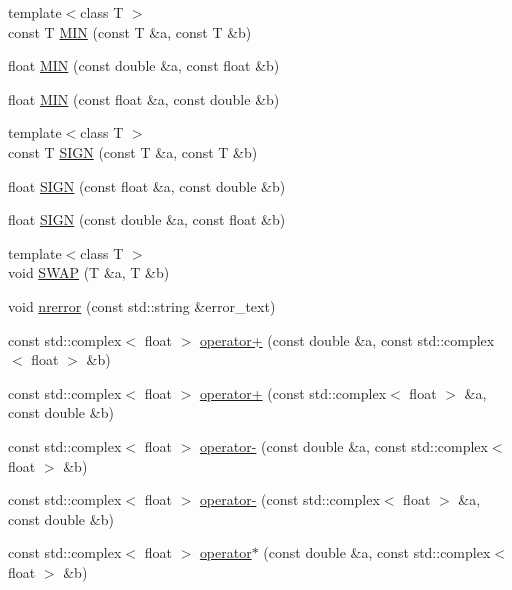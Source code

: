 \begin{DoxyCompactItemize}
\item 
{\footnotesize template$<$class T $>$ }\\const T \mbox{\hyperlink{namespaceNR_a15f220f878bd3544d0d5b2036cf73835}{M\+IN}} (const T \&a, const T \&b)
\item 
float \mbox{\hyperlink{namespaceNR_a5226e93da6f48d0d3702fa55e6c27052}{M\+IN}} (const double \&a, const float \&b)
\item 
float \mbox{\hyperlink{namespaceNR_a73fa23c417e474fe668884249420b5d9}{M\+IN}} (const float \&a, const double \&b)
\item 
{\footnotesize template$<$class T $>$ }\\const T \mbox{\hyperlink{namespaceNR_a7d16d361ddfe7454271c3a0a8050ece2}{S\+I\+GN}} (const T \&a, const T \&b)
\item 
float \mbox{\hyperlink{namespaceNR_a5269afc715518376429b015036ff955c}{S\+I\+GN}} (const float \&a, const double \&b)
\item 
float \mbox{\hyperlink{namespaceNR_a440c19c5d53c74535be8d59bc5b52a9f}{S\+I\+GN}} (const double \&a, const float \&b)
\item 
{\footnotesize template$<$class T $>$ }\\void \mbox{\hyperlink{namespaceNR_af3d3d41b75c1e0ce80f32a6c45576db3}{S\+W\+AP}} (T \&a, T \&b)
\item 
void \mbox{\hyperlink{namespaceNR_a61ef7c1cda6052203b5b115ef38e51da}{nrerror}} (const std\+::string \&error\+\_\+text)
\item 
const std\+::complex$<$ float $>$ \mbox{\hyperlink{namespaceNR_ad2f255483b92a41caf84daa8e4fb4f2d}{operator+}} (const double \&a, const std\+::complex$<$ float $>$ \&b)
\item 
const std\+::complex$<$ float $>$ \mbox{\hyperlink{namespaceNR_a248dbe3651d0e72fea48fde8c29d03c1}{operator+}} (const std\+::complex$<$ float $>$ \&a, const double \&b)
\item 
const std\+::complex$<$ float $>$ \mbox{\hyperlink{namespaceNR_ad075d6845549afa367e8eabac06de42c}{operator-\/}} (const double \&a, const std\+::complex$<$ float $>$ \&b)
\item 
const std\+::complex$<$ float $>$ \mbox{\hyperlink{namespaceNR_a24cad7076ed686ce43abaceed12e4a91}{operator-\/}} (const std\+::complex$<$ float $>$ \&a, const double \&b)
\item 
const std\+::complex$<$ float $>$ \mbox{\hyperlink{namespaceNR_abe1bfc853e642c91a1084cd7cc55da26}{operator$\ast$}} (const double \&a, const std\+::complex$<$ float $>$ \&b)
\item 

\end{DoxyCompactItemize}
